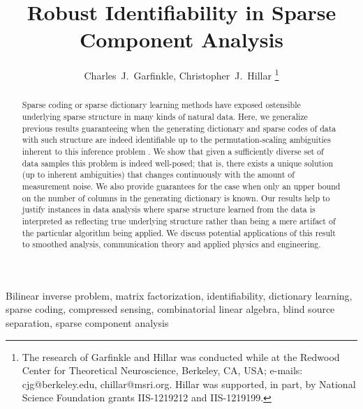 \documentclass[journal, onecolumn]{IEEEtran}
\begin{document}
\title{Robust Identifiability in Sparse Component Analysis}

\author{Charles~J.~Garfinkle,  Christopher~J.~Hillar
\thanks{The research of Garfinkle and Hillar was conducted while at the Redwood Center for Theoretical Neuroscience, Berkeley, CA, USA; e-mails: cjg@berkeley.edu, chillar@msri.org.  Hillar was supported, in part, by National Science Foundation grants IIS-1219212 and IIS-1219199.}}

\maketitle

\begin{abstract}
Sparse coding or sparse dictionary learning methods have exposed ostensible underlying sparse structure in many kinds of natural data. Here, we generalize previous results guaranteeing when the generating dictionary and sparse codes of data with such structure are indeed identifiable up to the permutation-scaling ambiguities inherent to this inference problem \cite{Hillar15}. We show that given a sufficiently diverse set of data samples this problem is indeed well-posed; that is, there exists a unique solution (up to inherent ambiguities) that changes continuously with the amount of measurement noise. We also provide guarantees for the case when only an upper bound on the number of columns in the generating dictionary is known. Our results help to justify instances in data analysis where sparse structure learned from the data is interpreted as reflecting true underlying structure rather than being a mere artifact of the particular algorithm being applied. We discuss potential applications of this result to smoothed analysis, communication theory and applied physics and engineering. 
\end{abstract}

\begin{IEEEkeywords}
Bilinear inverse problem, matrix factorization, identifiability, dictionary learning, sparse coding, compressed sensing, combinatorial linear algebra, blind source separation, sparse component analysis
\end{IEEEkeywords}

\end{document}
